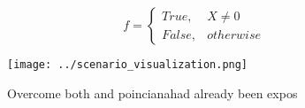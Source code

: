 \documentclass[a4paper]{article}
\begin{document}
\begin{equation}   f =
\begin{cases} True, & X \neq 0\\
False, & otherwise
\end{cases}
\end{equation}

\begin{figure}
\centering
\texttt{[image: ../scenario\_visualization.png]}
\caption{Overcome both and poincianahad already been expos
}
\end{figure}
 
\end{document}

